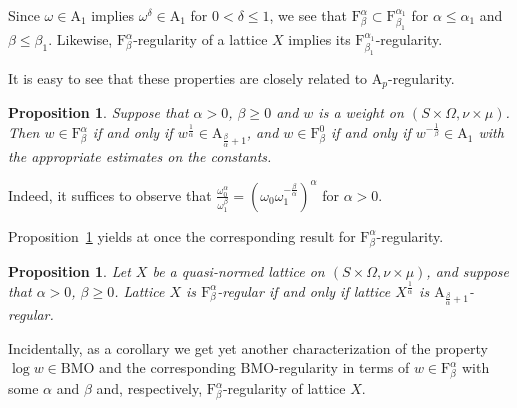 \documentclass[12pt]{amsart}
\newtheorem {proposition} [theorem] {Proposition}
\newcommand {\apclass} [1] {\ensuremath{\mathrm A_{#1}}}
\newcommand {\frclass} [2] {\ensuremath{\mathrm F^{#1}_{#2}}}
\newcommand {\BMO} {\ensuremath {\mathrm {BMO}}}
\newcommand {\weightw} {\ensuremath {\mathit w}}
\begin{document}
Since $\omega \in \apclass {1}$ implies $\omega^\delta \in \apclass {1}$ for $0 < \delta \leqslant 1$,
we see that $\frclass {\alpha} {\beta} \subset \frclass {\alpha_1} {\beta_1}$ for $\alpha \leqslant \alpha_1$
and $\beta \leqslant \beta_1$.  Likewise, $\frclass {\alpha} {\beta}$-regularity of a lattice $X$ implies its
$\frclass {\alpha_1} {\beta_1}$-regularity.

It is easy to see that these properties are closely related to $\apclass {p}$-regularity.
\begin {proposition}
\label {frapr}
Suppose that $\alpha > 0$, $\beta \geqslant 0$ and $\weightw$ is a weight on $(S \times \Omega, \nu \times \mu)$.
Then $\weightw \in \frclass {\alpha} {\beta}$ if and only if $\weightw^{\frac 1 \alpha} \in \apclass {\frac \beta \alpha + 1}$,
and $\weightw \in \frclass {0} {\beta}$ if and only if $\weightw^{-\frac 1 \beta} \in \apclass {1}$
with the appropriate estimates on the constants.
\end {proposition}
Indeed, it suffices to observe that 
$\frac {\omega_0^\alpha} {\omega_1^\beta} = \left(\omega_0 \omega_1^{-\frac \beta \alpha}\right)^\alpha$ for $\alpha > 0$.

Proposition~\ref {frapr} yields at once the corresponding result for $\frclass {\alpha} {\beta}$-regularity.
\begin {proposition}
\label {frapreg}
Let $X$ be a quasi-normed lattice on $(S \times \Omega, \nu \times \mu)$, and suppose that $\alpha > 0$, $\beta \geqslant 0$.
Lattice $X$ is $\frclass {\alpha} {\beta}$-regular if and only if lattice $X^{\frac 1 \alpha}$ is
$\apclass {\frac \beta \alpha + 1}$-regular.
\end {proposition}
Incidentally, as a corollary we get yet another characterization of the property $\log \weightw \in \BMO$ and
the corresponding $\BMO$-regularity in terms of $\weightw \in \frclass {\alpha} {\beta}$ with some $\alpha$ and $\beta$
and, respectively, $\frclass {\alpha} {\beta}$-regularity of lattice $X$.
\end{document}
